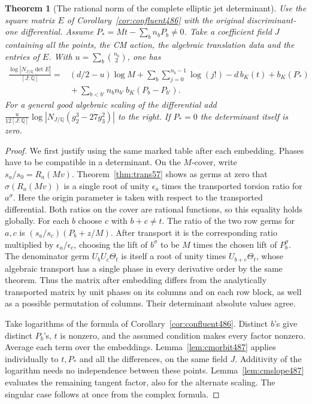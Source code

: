 \documentclass[a4paper,11pt]{article}
\newtheorem{theorem}[proposition]{Theorem}
\theoremstyle{definition}
\theoremstyle{remark}
\numberwithin{equation}{section}
\begin{document}
\begin{theorem}[The rational norm of the complete elliptic jet determinant]\leavevmode
\label{thm:jetnorm487}
Use the square matrix \(E\) of Corollary~\ref{cor:confluent486}
with the original discriminant-one differential. Assume
\(P_*=Mt-\sum_b n_bP_b\ne0\). Take a coefficient field \(J\)
containing all the points, the CM action, the algebraic
translation data and the entries of \(E\). With
\(u=\sum_b\binom{n_b}{2}\), one has
\[
 \begin{aligned}
 \frac{\log|N_{J/\mathbb Q}\det E|}{[J:\mathbb Q]}
   ={}& (d/2-u)\log M+\sum_b\sum_{j=0}^{n_b-1}\log(j!)
              -d\,b_K(t)+b_K(P_*)\\
      &{}+\sum_{b<b'} n_bn_{b'}\,b_K(P_b-P_{b'}).
 \end{aligned}
\]
For a general good algebraic scaling of the differential add
\(\frac{u}{12[J:\mathbb Q]}\log|N_{J/\mathbb Q}(g_2^3-27g_3^2)|\)
to the right. If \(P_*=0\) the determinant itself is zero.
\end{theorem}
\begin{proof}
We first justify using the same marked table after each
embedding. Phases have to be compatible in a determinant.
On the \(M\)-cover, write \(s_a/s_0=R_a(Mv)\). Theorem~\ref{thm:trans57}
shows as germs at zero that \(\sigma(R_a(Mv))\) is a single
root of unity \(\epsilon_a\) times the transported torsion ratio
for \(a^\sigma\). Here the origin parameter is taken with
respect to the transported differential. Both ratios on the
cover are rational functions, so this equality holds globally.
For each \(b\) choose \(c\) with \(b+c\ne t\). The ratio of
the two row germs for \(a,c\) is \((s_a/s_c)(P_b+z/M)\).
After transport it is the corresponding ratio multiplied by
\(\epsilon_a/\epsilon_c\), choosing the lift of \(b^\sigma\)
to be \(M\) times the chosen lift of \(P_b^\sigma\).
The denominator germ \(U_bU_c\Theta_t\) is itself a root of
unity times \(U_{b+c}\Theta_t\), whose algebraic transport has
a single phase in every derivative order by the same theorem.
Thus the matrix after embedding differs from the analytically
transported matrix by unit phases on its columns and on each
row block, as well as a possible permutation of columns.
Their determinant absolute values agree.

Take logarithms of the formula of
Corollary~\ref{cor:confluent486}. Distinct \(b\)'s give distinct
\(P_b\)'s, \(t\) is nonzero, and the assumed condition makes
every factor nonzero. Average each term over the embeddings.
Lemma~\ref{lem:cmorbit487} applies individually to \(t,P_*\)
and all the differences, on the same field \(J\). Additivity
of the logarithm needs no independence between these points.
Lemma~\ref{lem:cmslope487} evaluates the remaining tangent
factor, also for the alternate scaling. The singular case
follows at once from the complex formula.
\end{proof}
\end{document}
